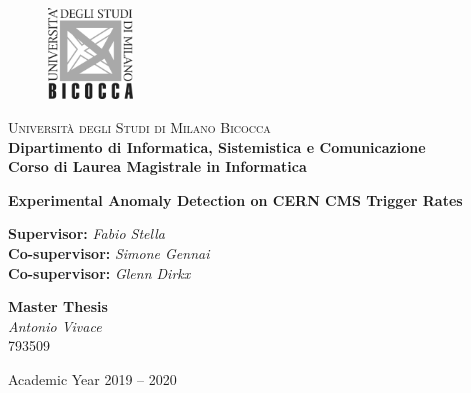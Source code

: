 
\thispagestyle{empty}

\begin{figure}
	\vspace*{-8mm}
	\centering
	\includegraphics[width=0.20\textwidth]{logo-bicocca.jpg}
\end{figure}
\large \noindent \textsc{Università degli Studi di Milano Bicocca} \\
\textbf{Dipartimento di Informatica, Sistemistica e Comunicazione \\
	Corso di Laurea Magistrale in Informatica}

\vfill


\begin{center}
	{\Huge \textbf{Experimental Anomaly Detection on CERN CMS Trigger Rates}}
\end{center}

\vfill

\begin{flushleft}
	{\Large \textbf{Supervisor:} \textit{Fabio Stella} \\
		\textbf{Co-supervisor:} \textit{Simone Gennai} \\
		\textbf{Co-supervisor:} \textit{Glenn Dirkx}}
\end{flushleft}

\vspace{8mm}
\par

\begin{flushright}
	{\Large \textbf{Master Thesis} \\
		\textit{Antonio Vivace} \\ 793509}
\end{flushright}

\vfill
\par

\begin{center}
	{\large Academic Year 2019 -- 2020}
\end{center}

\clearpage